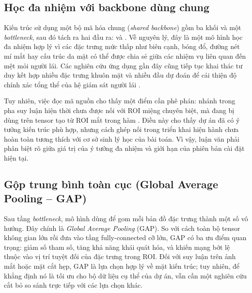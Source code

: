 \documentclass[12pt,a4paper]{article}
\begin{document}
\subsection{Học đa nhiệm với backbone dùng chung}
Kiến trúc  sử dụng một bộ mã hóa chung (\textit{shared backbone}) gồm ba khối  và một \textit{bottleneck}, sau đó tách ra hai đầu ra:  và . Về nguyên lý, đây là một mô hình học đa nhiệm hợp lý vì các đặc trưng mức thấp như biên cạnh, bóng đổ, đường nét mí mắt hay cấu trúc da mặt có thể được chia sẻ giữa các nhiệm vụ liên quan đến mệt mỏi người lái. Các nghiên cứu ứng dụng gần đây cũng tiếp tục khai thác tư duy kết hợp nhiều đặc trưng khuôn mặt và nhiều đầu dự đoán để cải thiện độ chính xác tổng thể của hệ giám sát người lái \cite{dong2022,review2022}.

Tuy nhiên, việc đọc mã nguồn cho thấy một điểm cần phê phán: nhánh  trong pha suy luận hiện thời chưa được nối với ROI miệng chuyên biệt, mà đang bị dùng trên tensor tạo từ ROI mắt trong hàm . Điều này cho thấy dự án đã có ý tưởng kiến trúc phù hợp, nhưng cách ghép nối trong triển khai hiện hành chưa hoàn toàn tương thích với cơ sở sinh lý học của bài toán. Vì vậy, luận văn phải phân biệt rõ giữa giá trị của ý tưởng đa nhiệm và giới hạn của phiên bản cài đặt hiện tại.

\subsection{Gộp trung bình toàn cục (Global Average Pooling -- GAP)}
Sau tầng \textit{bottleneck}, mô hình dùng  để gom mỗi bản đồ đặc trưng thành một số vô hướng. Đây chính là \textit{Global Average Pooling} (GAP). So với cách  toàn bộ tensor không gian lớn rồi đưa vào tầng fully-connected cỡ lớn, GAP có ba ưu điểm quan trọng: giảm số tham số, tăng khả năng khái quát hóa, và khiến mạng bớt lệ thuộc vào vị trí tuyệt đối của đặc trưng trong ROI. Đối với suy luận trên ảnh mắt hoặc mặt cắt hẹp, GAP là lựa chọn hợp lý về mặt kiến trúc; tuy nhiên, để khẳng định nó là tối ưu cho bộ dữ liệu cụ thể của dự án, vẫn cần một nghiên cứu cắt bỏ so sánh trực tiếp với các lựa chọn khác.
\end{document}
